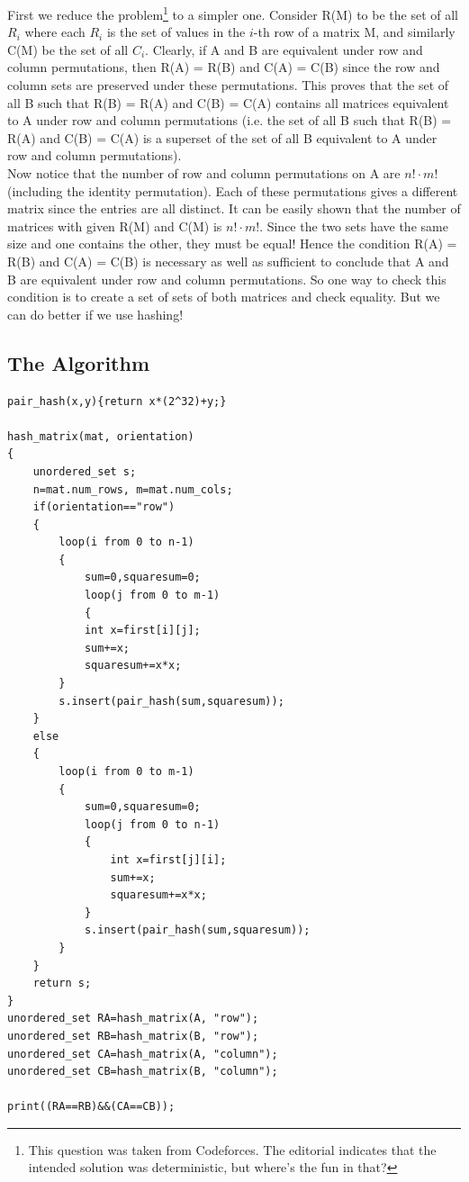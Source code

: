 First we reduce the problem\footnote{This question was taken from Codeforces. The editorial indicates 
that the intended solution was deterministic, but where's the fun in that?} to a simpler one. 
Consider R(M) to be the set of all $R_i$ where each $R_i$ is the set of values in the $i$-th row of 
a matrix M, and similarly C(M) be the set of all $C_i$. Clearly, if A and B are equivalent under 
row and column permutations, then R(A) = R(B) and C(A) = C(B) since the row and column sets are 
preserved under these permutations. This proves that the set of all B such that R(B) = R(A) and 
C(B) = C(A) contains all matrices equivalent to A under row and column permutations (i.e. the 
set of all B such that R(B) = R(A) and C(B) = C(A) is a superset of the set of all B equivalent to A 
under row and column permutations).\\


\noindent Now notice that the number of row and column permutations on A 
are $n!\cdot m!$ (including the identity permutation). Each of these permutations gives 
a different matrix since the entries are all distinct. It can be easily shown that the number 
of matrices with given R(M) and C(M) is $n!\cdot m!$. Since the two sets have the same size and 
one contains the other, they must be equal! Hence the condition R(A) = R(B) and C(A) = C(B) is necessary 
as well as sufficient to conclude that A and B are equivalent under row and column permutations. So one way to 
check this condition is to create a set of sets of both matrices and check equality. But we 
can do better if we use hashing!

\subsection{The Algorithm}
\begin{center}
\begin{minipage}{0.9\linewidth}
\begin{framed}
\begin{Verbatim}
pair_hash(x,y){return x*(2^32)+y;}

hash_matrix(mat, orientation)
{
	unordered_set s;
	n=mat.num_rows, m=mat.num_cols;
	if(orientation=="row")
	{
		loop(i from 0 to n-1)
		{
		    sum=0,squaresum=0;
		    loop(j from 0 to m-1)
		    {
	        int x=first[i][j];
	        sum+=x;
	        squaresum+=x*x;
	    }
	    s.insert(pair_hash(sum,squaresum));
	}
	else
	{
	    loop(i from 0 to m-1)
	    {
	        sum=0,squaresum=0;
	        loop(j from 0 to n-1)
	        {
	            int x=first[j][i];
	            sum+=x;
	            squaresum+=x*x;
	        }
	        s.insert(pair_hash(sum,squaresum));
	    }
	}
	return s;
}
unordered_set RA=hash_matrix(A, "row");
unordered_set RB=hash_matrix(B, "row");
unordered_set CA=hash_matrix(A, "column");
unordered_set CB=hash_matrix(B, "column");

print((RA==RB)&&(CA==CB));
\end{Verbatim}
\vspace{-4mm}
\end{framed}
\end{minipage}
\end{center}


